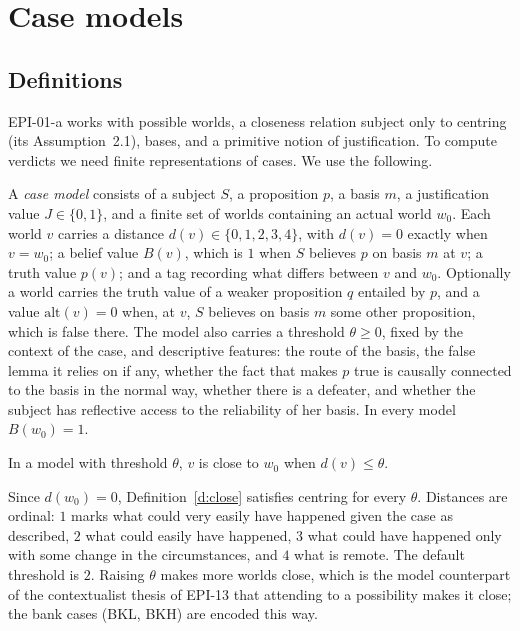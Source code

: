 \documentclass{situationist-preprint}
\begin{document}
\section{Case models}\label{s:frame}

\subsection{Definitions}

EPI-01-a works with possible worlds, a closeness relation subject only to centring (its Assumption~2.1), bases, and a primitive notion of justification. To compute verdicts we need finite representations of cases. We use the following.

\begin{definition}\label{d:model}
A \emph{case model} consists of a subject $S$, a proposition $p$, a basis $m$, a justification value $J \in \{0,1\}$, and a finite set of worlds containing an actual world $w_0$. Each world $v$ carries a distance $d(v) \in \{0,1,2,3,4\}$, with $d(v) = 0$ exactly when $v = w_0$; a belief value $B(v)$, which is $1$ when $S$ believes $p$ on basis $m$ at $v$; a truth value $p(v)$; and a tag recording what differs between $v$ and $w_0$. Optionally a world carries the truth value of a weaker proposition $q$ entailed by $p$, and a value $\mathrm{alt}(v) = 0$ when, at $v$, $S$ believes on basis $m$ some other proposition, which is false there. The model also carries a threshold $\theta \geq 0$, fixed by the context of the case, and descriptive features: the route of the basis, the false lemma it relies on if any, whether the fact that makes $p$ true is causally connected to the basis in the normal way, whether there is a defeater, and whether the subject has reflective access to the reliability of her basis. In every model $B(w_0) = 1$.
\end{definition}

\begin{definition}\label{d:close}
In a model with threshold $\theta$, $v$ is close to $w_0$ when $d(v) \leq \theta$.
\end{definition}

Since $d(w_0) = 0$, Definition~\ref{d:close} satisfies centring for every $\theta$. Distances are ordinal: $1$ marks what could very easily have happened given the case as described, $2$ what could easily have happened, $3$ what could have happened only with some change in the circumstances, and $4$ what is remote. The default threshold is $2$. Raising $\theta$ makes more worlds close, which is the model counterpart of the contextualist thesis of EPI-13 that attending to a possibility makes it close; the bank cases (BKL, BKH) are encoded this way.
\end{document}
